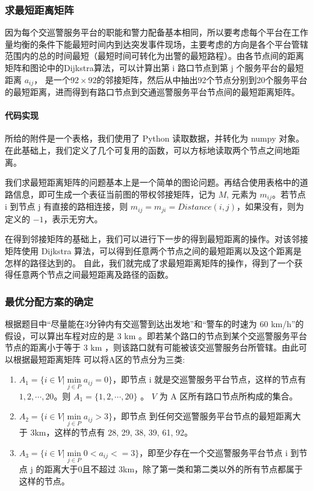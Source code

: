 \documentclass{cumcmthesis}
\begin{document}
    \subsubsection{求最短距离矩阵}

      因为每个交巡警服务平台的职能和警力配备基本相同，所以要考虑每个平台在工作量均衡的条件下能最短时间内到达突发事件现场，主要考虑的方向是各个平台管辖范围内的总的时间最短（最短时间可转化为出警的最短路程）。由各节点间的距离矩阵和图论中的Dijkstra算法，可以计算出第 i 路口节点到第 j 个服务平台的最短距离 $a_{ij}$， 是一个$92 \times 92$的邻接矩阵，然后从中抽出92个节点分别到20个服务平台的最短距离，进而得到有路口节点到交通巡警服务平台节点间的最短距离矩阵。


      \paragraph{代码实现}
        所给的附件是一个表格，我们使用了 Python 读取数据，并转化为 numpy 对象。在此基础上，我们定义了几个可复用的函数，可以方标地读取两个节点之间地距离。

        我们求最短距离矩阵的问题基本上是一个简单的图论问题。再结合使用表格中的道路信息，即可生成一个表征当前图的带权邻接矩阵，记为 $M$, 元素为 $m_{ij}$。若节点 i 到节点 j 有直接的路相连接，则 $m_{ij} = m_{ji} = Distance(i, j)$，如果没有，则为定义的 $-1$，表示无穷大。\cite{uuju}

        在得到邻接矩阵的基础上，我们可以进行下一步的得到最短距离的操作。对该邻接矩阵使用 Dijkstra 算法，可以得到任意两个节点之间的最短距离以及这个距离是怎样的路径达到的。
        自此，我们就完成了求最短距离矩阵的操作，得到了一个获得任意两个节点之间最短距离及路径的函数。

    \subsubsection{最优分配方案的确定}

      根据题目中“尽量能在3分钟内有交巡警到达出发地”和“警车的时速为 60 km/h”的假设，可以算出车程对应的是 3 km 。即若某个路口的节点到某个交巡警服务平台节点的距离小于等于 3 km ，则该路口就有可能被该交巡警服务台所管辖。由此可以根据最短距离矩阵 可以将A区的节点分为三类:\cite{ffpw}

      \begin{enumerate}
        \item $A_1 = \{ i \in V | \min\limits_{j \in P} a_{ij} = 0 \}$，即节点 i 就是交巡警服务平台节点，这样的节点有$1, 2, \cdots, 20$。则 $A_1 = \{ 1, 2, \cdots, 20\}$ 。 $V$ 为 A 区所有路口节点所构成的集合。
        \item $A_2 = \{ i \in V | \min\limits_{j \in P} a_{ij} > 3 \}$，即节点 到任何交巡警服务平台节点的最短距离大于 3km，这样的节点有 28, 29, 38, 39, 61, 92。
        \item $A_3 = \{ i \in V | \min\limits_{j \in P} 0 < a_{ij} <= 3 \}$，即至少存在一个交巡警服务平台节点 i 到节点 j 的距离大于0且不超过 3km，除了第一类和第二类以外的所有节点都属于这样的节点。
      \end{enumerate}
\end{document}

